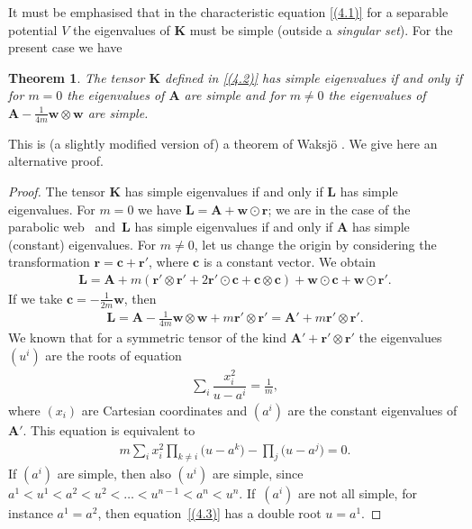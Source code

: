 \documentclass[pdftex]{sigma}
\def\bs{\boldsymbol}
\numberwithin{equation}{section}
\newtheorem{Theorem}{Theorem}[section]
 { \theoremstyle{definition}
\newtheorem{Notation}[Theorem]{Notation}
\newtheorem{Example}[Theorem]{Example}
\newtheorem{Remark}[Theorem]{Remark}
\newtheorem{Remarks}[Theorem]{Remarks}
 }
\begin{document}
It must be emphasised that in the characteristic equation \eqref{(4.1)} for a separable potential $V$ the eigenvalues of $\bs K$ must be simple (outside a {\it singular set}). For the present case we have

\begin{Theorem}\label{t:4.4}
The tensor $\bs K$ defined in \eqref{(4.2)} has simple eigenvalues if and only if for $m=0$ the eigenvalues of $\bs A$ are simple and for $m\neq 0$ the eigenvalues of $\bs A-\tfrac 1{4m} \bs w\otimes\bs w$
are simple.
\end{Theorem}

This is (a slightly modif\/ied version of) a theorem of Waksj\"o \cite[p.~45]{Waksjo-2000}. We give here an alternative proof.

\begin{proof}
The tensor $\bs K$ has simple eigenvalues if and only if $\bs L$ has simple eigenvalues.
For $m=0$ we have $\bs L=\bs A+\bs w\odot \bs r$; we are in the case of the parabolic web~\cite{Benenti-1992b} and~$\bs L$ has simple eigenvalues if and only if $\bs A$ has simple (constant) eigenvalues.
For $m\neq 0$, let us change the origin by considering the transformation $\bs r=\bs c+\bs r'$,
where $\bs c$ is a constant vector. We obtain
\begin{gather*}
\bs L=\bs A+m  (\bs r'\otimes \bs r'+2 \bs r'\odot\bs c+\bs c\otimes\bs c)+
\bs w\odot \bs c +\bs w\odot\bs r'.
\end{gather*}
If we take $\bs c= -\tfrac 1{2m} \bs w$, then
\begin{gather*}
\bs L=\bs A-\tfrac 1{4m}   \bs w\otimes\bs w + m  \bs r'\otimes \bs r'=\bs A'+m  \bs r'\otimes \bs r'.
\end{gather*}
We known that for a symmetric tensor of the kind $\bs A'+\bs r'\otimes\bs r'$ the eigenvalues $(u^i)$
are the roots of equation
\begin{gather*}
\sum_i\dfrac{x_i^2}{u-a^i}=\frac 1m,
\end{gather*}
where $(x_i)$ are Cartesian coordinates and $(a^i)$ are the constant eigenvalues of $\bs A'$.
This equation is equivalent to
\begin{gather}
m \sum_i x_i^2 \prod_{k\neq i} \big(u-a^k\big)- \prod_j\big(u-a^j\big)=0.
\label{(4.3)}
\end{gather}
If $(a^i)$ are simple, then also $(u^i)$ are simple, since $a^1< u^1 < a^2 < u^2 < \ldots < u^{n-1} < a^n < u^n$. If~$(a^i)$ are not all simple, for instance $a^1=a^2$, then equation~\eqref{(4.3)} has a double root $u=a^1$.
\end{proof}
\end{document}
